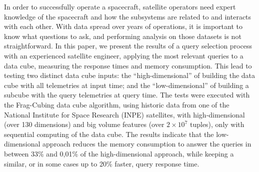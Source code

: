 
\begin{resumo}

\hypertarget{estilo:resumo}{} %

In order to successfully operate a spacecraft, satellite operators need expert knowledge of the spacecraft and how the subsystems are related to and interacts with each other. With data spread over years of operations, it is important to know what questions to ask, and performing analysis on those datasets is not straightforward. In this paper, we present the results of a query selection process with an experienced satellite engineer, applying the most relevant queries to a data cube, measuring the response times and memory consumption. This lead to testing two distinct data cube inputs: the ``high-dimensional'' of building the data cube with all telemetries at input time; and the ``low-dimensional'' of building a subcube with the query telemetries at query time. The tests were executed with the Frag-Cubing data cube algorithm, using historic data from one of the National Institute for Space Research (INPE) satellites, with high-dimensional (over 130 dimensions) and big volume features (over \(\ensuremath{2\times 10^{7}}\) tuples), only with sequential computing of the data cube. The results indicate that the low-dimensional approach reduces the memory consumption to answer the queries in between 33\% and 0,01\% of the high-dimensional approach, while keeping a similar, or in some cases up to 20\% faster, query response time.


\end{resumo}
